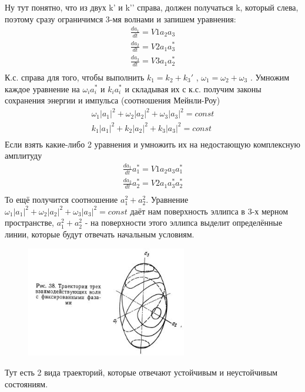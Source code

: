 \documentclass[10pt, a4paper]{article}
\begin{document}
Ну тут понятно, что из двух k’ и k’’ справа, должен получаться k, который слева, поэтому сразу ограничимся 3-мя волнами и запишем уравнения:
\begin{align}
	\frac{d a_1}{dt}=V1 a_2 a_3 \\
	\frac{d a_2}{dt}=V2 a_1 a^{*}_3 \\
	\frac{d a_3}{dt}=V3 a_1 a^{*}_2 \\
\end{align}
К.с. справа для того, чтобы выполнить $k_1=k_2+k_3'$ , $\omega_1=\omega_2+\omega_3$ . 
Умножим каждое уравнение на $\omega_i a^{*}_i$ и $k_i a^{*}_i$ и складывая их с к.с. получим законы сохранения энергии и импульса (соотношения Мейнли-Роу) 
\begin{align}
	\omega_1 |a_1|^2 + \omega_2 |a_2|^2 + \omega_3 |a_3|^2 = const \\
	k_1 |a_1|^2+ k_2 |a_2|^2 + k_3 |a_3|^2  = const \\	
\end{align}
Если взять какие-либо 2 уравнения и умножить их на недостающую комплексную амплитуду
\begin{align}
	\frac{d a_1}{dt} a^{*}_1=V1 a_2 a_3 a^{*}_1 \\
	\frac{d a_2}{dt} a^{*}_2=V2 a_1 a^{*}_3 a^{*}_2 \\
\end{align}
То ещё получится соотношение $a^{2}_1+a^{2}_2$.
Уравнение  $\omega_1 |a_1|^2 + \omega_2 |a_2|^2 + \omega_3 |a_3|^2 = const$ даёт нам поверхность эллипса в 3-х мерном пространстве,  $a^{2}_1+a^{2}_2$ - на поверхности этого эллипса выделит определённые линии, которые будут отвечать начальным условиям.

\begin{figure}[ht]
	\begin{center}
		\includegraphics[width=70mm]{Wavetrans1.JPG}
	\end{center}
\end{figure}

Тут есть 2 вида траекторий, которые отвечают устойчивым и неустойчивым состояниям.
\end{document}
